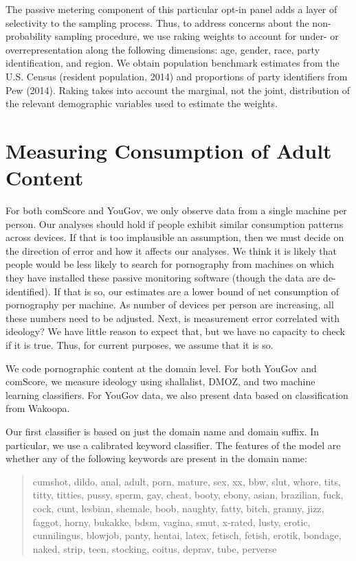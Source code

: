\documentclass[12pt, letterpaper]{article}
\begin{document}
The passive metering component of this particular opt-in panel adds a layer of selectivity to the sampling process. Thus, to address concerns about the non-probability sampling procedure, we use raking weights to account for under- or overrepresentation along the following dimensions: age, gender, race, party identification, and region. We obtain population benchmark estimates from the U.S. Census (resident population, 2014) and proportions of party identifiers from Pew (2014). Raking takes into account the marginal, not the joint, distribution of the relevant demographic variables used to estimate the weights.

\section*{Measuring Consumption of Adult Content}
For both comScore and YouGov, we only observe data from a single machine per person. Our analyses should hold if people exhibit similar consumption patterns across devices. If that is too implausible an assumption, then we must decide on the direction of error and how it affects our analyses. We think it is likely that people would be less likely to search for pornography from machines on which they have installed these passive monitoring software (though the data are de-identified). If that is so, our estimates are a lower bound of net consumption of pornography per machine. As number of devices per person are increasing, all these numbers need to be adjusted. Next, is measurement error correlated with ideology? We have little reason to expect that, but we have no capacity to check if it is true. Thus, for current purposes, we assume that it is so. 

We code pornographic content at the domain level. For both YouGov and comScore, we measure ideology using shallalist, DMOZ, and two machine learning classifiers. For YouGov data, we also present data based on classification from Wakoopa. 

Our first classifier is based on just the domain name and domain suffix. In particular, we use a calibrated keyword classifier. The features of the model are whether any of the following keywords are present in the domain name:

\begin{quote}
cumshot, dildo, anal, adult, porn, mature, sex, xx, bbw, slut, whore, tits, titty, titties, pussy, sperm, gay, cheat, booty, ebony, asian, brazilian, fuck, cock, cunt, lesbian, shemale, boob, naughty, fatty, bitch, granny, jizz, faggot, horny, bukakke, bdsm, vagina, smut, x-rated, lusty, erotic, cunnilingus, blowjob, panty, hentai, latex, fetisch, fetish, erotik, bondage, naked, strip, teen, stocking, coitus, deprav, tube, perverse 
\end{quote}
\end{document}
